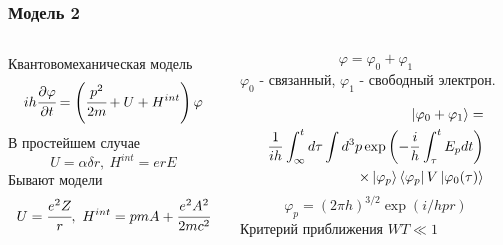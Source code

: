 \documentclass[handout]{beamer}
\newcommand{\piv}[2]{\cfrac{\partial #1}{\partial #2}}
\newcommand{\inner}[1]{\left( #1 \right)}
\renewcommand{\phi}{\varphi}
\begin{document}
\begin{frame}
    \frametitle{Модель 2}
    \begin{columns}
        \begin{column}{0.5\textwidth}
            Квантовомеханическая модель
            \begin{equation}
                i h \piv{\phi}{t} = \inner{\cfrac{p^2}{2m} + U + H^{int}}\phi 
            \end{equation}
            В простейшем случае
            \begin{equation}
                U = \alpha \delta r, \ H^{int} = erE
            \end{equation}
            Бывают модели 
            \begin{equation}
                U = \cfrac{e^2Z}{r}, \ H^{int} = pmA + \cfrac{e^2 A^2}{2mc^2}
            \end{equation}
            
        \end{column}
        
        \begin{column}{0.5\textwidth}
            \begin{equation*}
                \phi = \phi_0 + \phi_1
            \end{equation*}
            $\phi_0$ - связанный, $\phi_1$ - свободный электрон.

            \begin{align*}
                \ket{\phi_0 + \phi_1} = \\
                \frac{1}{ih} \int_{\infty}^{t} d\tau \int d^3 p
                \exp\inner{-\frac{i}{h} \int_\tau^{t} E_p dt} \\
                \times \ket{\phi_p}\bra{\phi_p}V\ket{\phi_0(\tau)}
            \end{align*}
            \begin{equation*}
                \phi_p = \inner{2\pi h}^{3/2} \exp\inner{i/h pr}
            \end{equation*}
            Критерий приближения $WT \ll 1$
        \end{column}
      \end{columns}
\end{frame}
\end{document}
